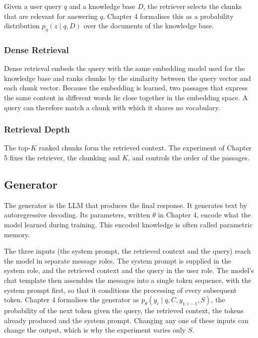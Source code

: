 \documentclass[12pt,a4paper,oneside]{scrreprt}
\begin{document}
Given a user query $q$ and a knowledge base $D$, the retriever selects the chunks
that are relevant for answering $q$. Chapter 4 formalises this as a probability
distribution $p_\eta(z \mid q,D)$ over the documents of the knowledge base.
\subsubsection{Dense Retrieval}

Dense retrieval embeds the query with the same embedding model used for the
knowledge base and ranks chunks by the similarity between the query vector and
each chunk vector. Because the embedding is learned, two passages that express
the same content in different words lie close together in the embedding space. A query can therefore match
a chunk with which it shares no vocabulary.

\subsubsection{Retrieval Depth}

The top-$K$ ranked chunks form the retrieved context. The
experiment of Chapter 5 fixes the retriever, the chunking and $K$, and controls
the order of the passages.

\subsection{Generator}
\label{sec:generator}

The generator is the LLM that produces the final response. It generates text by autoregressive decoding. Its parameters, written
$\theta$ in Chapter 4, encode what the model learned during training. This
encoded knowledge is often called parametric memory.

The three inputs (the system prompt, the retrieved context and the query) reach the model in separate message roles. The system prompt is
supplied in the system role, and the retrieved context and the query in the user
role. The model's chat template then assembles the messages into a single token sequence, with the system prompt first, so that it conditions the processing of every subsequent token. Chapter 4 formalises the generator as
$p_\theta(y_i \mid q,C,y_{1:i-1},S)$, the probability of the next token given the
query, the retrieved context, the tokens already produced and the system prompt.
Changing any one of these inputs can change the output, which is why the
experiment varies only $S$.
\end{document}
